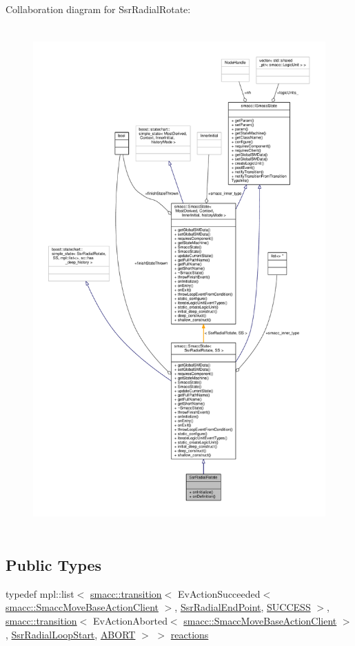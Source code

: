 Collaboration diagram for Ssr\+Radial\+Rotate\+:
\nopagebreak
\begin{figure}[H]
\begin{center}
\leavevmode
\includegraphics[height=550pt]{structSsrRadialRotate__coll__graph}
\end{center}
\end{figure}
\subsection*{Public Types}
\begin{DoxyCompactItemize}
\item 
typedef mpl\+::list$<$ \hyperlink{classsmacc_1_1transition}{smacc\+::transition}$<$ Ev\+Action\+Succeeded$<$ \hyperlink{classsmacc_1_1SmaccMoveBaseActionClient}{smacc\+::\+Smacc\+Move\+Base\+Action\+Client} $>$, \hyperlink{structSsrRadialEndPoint}{Ssr\+Radial\+End\+Point}, \hyperlink{classSUCCESS}{S\+U\+C\+C\+E\+SS} $>$, \hyperlink{classsmacc_1_1transition}{smacc\+::transition}$<$ Ev\+Action\+Aborted$<$ \hyperlink{classsmacc_1_1SmaccMoveBaseActionClient}{smacc\+::\+Smacc\+Move\+Base\+Action\+Client} $>$, \hyperlink{structSsrRadialLoopStart}{Ssr\+Radial\+Loop\+Start}, \hyperlink{classABORT}{A\+B\+O\+RT} $>$ $>$ \hyperlink{structSsrRadialRotate_aa245c3696d8d119ec6f2ea5573f6b7ea}{reactions}
\end{DoxyCompactItemize}

